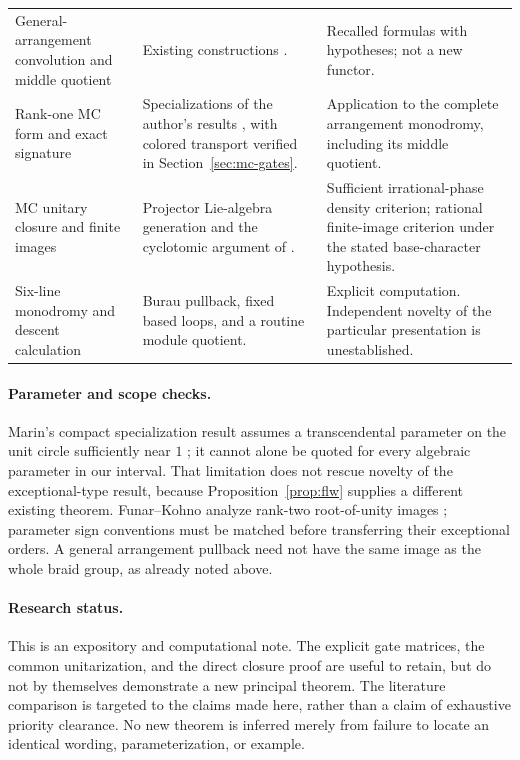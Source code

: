 \documentclass[11pt,a4paper]{article}
\theoremstyle{remark}\newtheorem{remark}[theorem]{Remark}
\begin{document}
\begin{longtable}{@{}p{}p{}p{}@{}}
General-arrangement convolution and middle quotient & Existing constructions \cite{AH,Hiroe,HN}. & Recalled formulas with hypotheses; not a new functor.\\
Rank-one MC form and exact signature & Specializations of the author's results \cite{NegamiKZ,NegamiSignature}, with colored transport verified in Section~\ref{sec:mc-gates}. & Application to the complete arrangement monodromy, including its middle quotient.\\
MC unitary closure and finite images & Projector Lie-algebra generation and the cyclotomic argument of \cite{NegamiFinite}. & Sufficient irrational-phase density criterion; rational finite-image criterion under the stated base-character hypothesis.\\
Six-line monodromy and descent calculation & Burau pullback, fixed based loops, and a routine module quotient. & Explicit computation. Independent novelty of the particular presentation is unestablished.\\
\bottomrule
\end{longtable}

\paragraph{Parameter and scope checks.}
Marin's compact specialization result assumes a transcendental parameter
on the unit circle sufficiently near $1$ \cite[Theorem~4]{Marin}; it
cannot alone be quoted for every algebraic parameter in our interval.
That limitation does not rescue novelty of the exceptional-type result,
because Proposition~\ref{prop:flw} supplies a different existing theorem.
Funar--Kohno analyze rank-two root-of-unity images \cite{FK}; parameter
sign conventions must be matched before transferring their exceptional
orders.  A general arrangement pullback need not have the same image
as the whole braid group, as already noted above.

\paragraph{Research status.}
This is an expository and computational note.
The explicit gate matrices, the common unitarization, and the direct
closure proof are useful to retain, but do not by themselves demonstrate
a new principal theorem.  The literature comparison is targeted to the
claims made here, rather than a claim of exhaustive priority clearance.
No new theorem is inferred merely from failure to locate an identical
wording, parameterization, or example.
\end{document}
